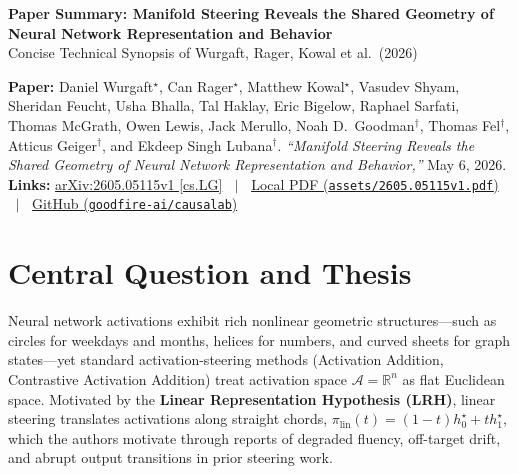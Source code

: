 \documentclass[10pt,a4paper]{article}
\newcommand{\R}{\mathbb{R}}
\begin{document}
\begin{center}
    {\LARGE \textbf{Paper Summary: Manifold Steering Reveals the Shared Geometry of Neural Network Representation and Behavior}}\\[0.4em]
    {\normalsize Concise Technical Synopsis of Wurgaft, Rager, Kowal et al.\ (2026)}
\end{center}

\begin{metaheader}
\small\raggedright
\textbf{Paper:} Daniel Wurgaft$^\star$, Can Rager$^\star$, Matthew Kowal$^\star$, Vasudev Shyam, Sheridan Feucht, Usha Bhalla, Tal Haklay, Eric Bigelow, Raphael Sarfati, Thomas McGrath, Owen Lewis, Jack Merullo, Noah D.\ Goodman$^\dagger$, Thomas Fel$^\dagger$, Atticus Geiger$^\dagger$, and Ekdeep Singh Lubana$^\dagger$. \emph{``Manifold Steering Reveals the Shared Geometry of Neural Network Representation and Behavior,''} May 6, 2026.\\[0.25em]
\textbf{Links:} \href{https://arxiv.org/abs/2605.05115}{arXiv:2605.05115v1 [cs.LG]} $\;\mid\;$ \href{run:assets/2605.05115v1.pdf}{Local PDF (\texttt{assets/2605.05115v1.pdf})} $\;\mid\;$ \href{https://github.com/goodfire-ai/causalab/tree/manifold_steering}{GitHub (\texttt{goodfire-ai/causalab})}
\end{metaheader}

\section{Central Question and Thesis}

Neural network activations exhibit rich nonlinear geometric structures---such as circles for weekdays and months, helices for numbers, and curved sheets for graph states---yet standard activation-steering methods (Activation Addition, Contrastive Activation Addition) treat activation space $\mathcal{A} = \R^n$ as flat Euclidean space. Motivated by the \textbf{Linear Representation Hypothesis (LRH)}, linear steering translates activations along straight chords, $\pi_{\mathrm{lin}}(t) = (1-t)h_0^\star + t h_1^\star$, which the authors motivate through reports of degraded fluency, off-target drift, and abrupt output transitions in prior steering work.
\end{document}
